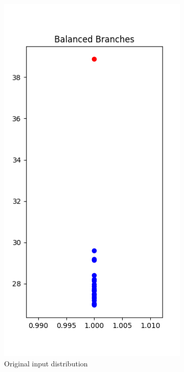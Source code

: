 \begin{figure}
\centering
\begin{subfigure}{.5\textwidth}
  \centering
  \includegraphics[width=.7\linewidth]{figures/branches0.png}
  \caption{Original input distribution}
  \label{fig:sub1}
\end{subfigure}%
\begin{subfigure}{.5\textwidth}
  \centering

\end{subfigure}
\end{figure}
